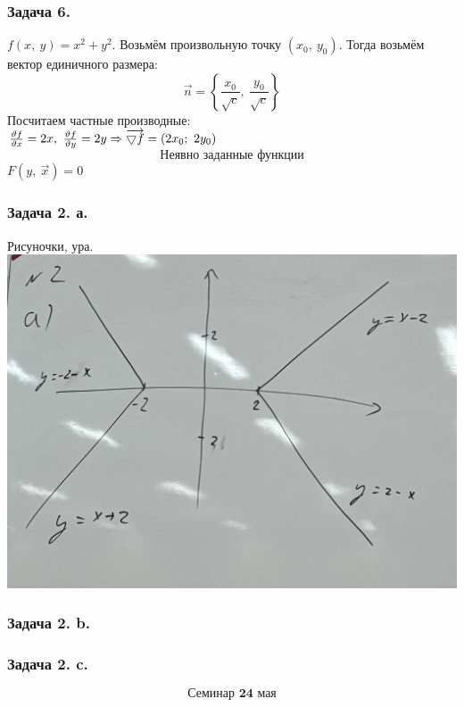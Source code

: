 \documentclass[12pt, letterpaper, twoside]{article}
\begin{document}
    \subsubsection*{Задача 6.}
    $f(x,\ y) = x^2 + y^2$. Возьмём произвольную точку $(x_0,\ y_0)$. Тогда возьмём вектор единичного размера:
    \[\vec{n} = \left\{ \frac{x_0}{\sqrt{c}},\ \frac{y_0}{\sqrt{c}} \right\}\]
    Посчитаем частные производные:\\
    $\frac{\vartheta f}{\vartheta x} = 2x,\ \frac{\vartheta f}{\vartheta y} = 2y\Rightarrow \overrightarrow{\varbigtriangledown f} = (2x_0;\ 2y_0)$
    \[\textbf{Неявно заданные функции}\]
    $F(y,\ \vec{x}) = 0$
    \subsubsection*{Задача 2. а.}
    Рисуночки, ура.
    \includegraphics[width=0.5\linewidth]{../pictures/Graph a.jpg}
    \subsubsection*{Задача 2. b.}
    \subsubsection*{Задача 2. c.}

\[\textbf{Семинар 24 мая}\]
\end{document}
